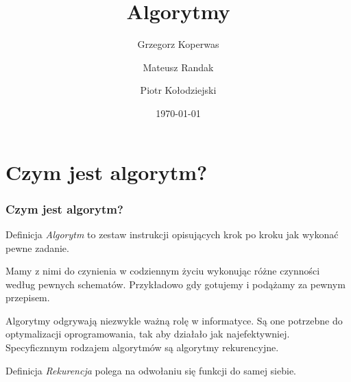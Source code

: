 \documentclass{beamer}
\title{Algorytmy}
\author{Grzegorz Koperwas \and Mateusz Randak \and Piotr Kołodziejski}
\date{\today}
\begin{document}
    \begin{frame}
        \titlepage
    \end{frame}
    \section{Czym jest algorytm?}
    \begin{frame}
        \frametitle{Czym jest algorytm?}
        \begin{block}{Definicja}
            \emph{Algorytm} to zestaw instrukcji opisujących krok po kroku jak wykonać pewne zadanie.   
        \end{block}
        Mamy z nimi do czynienia w codziennym życiu wykonując różne czynności według pewnych schematów. Przykładowo gdy gotujemy i podążamy za pewnym przepisem.

        Algorytmy odgrywają niezwykle ważną rolę w informatyce. Są one potrzebne do optymalizacji oprogramowania, tak aby działało jak najefektywniej. Specyficznnym rodzajem algorytmów są algorytmy rekurencyjne. 

        \begin{block}{Definicja}
            \emph{Rekurencja} polega na odwołaniu się funkcji do samej siebie.
        \end{block}
    \end{frame}
\end{document}
